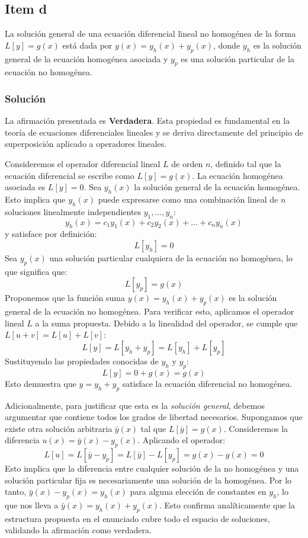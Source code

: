 \documentclass[a4paper]{article}
\begin{document}
\subsection{Item d}
La solución general de una ecuación diferencial lineal no homogénea de la forma $L[y] = g(x)$ está dada por $y(x) = y_h(x) + y_p(x)$, donde $y_h$ es la solución general de la ecuación homogénea asociada y $y_p$ es una solución particular de la ecuación no homogénea.

\subsubsection{Solución}
La afirmación presentada es \textbf{Verdadera}. Esta propiedad es fundamental en la teoría de ecuaciones diferenciales lineales y se deriva directamente del principio de superposición aplicado a operadores lineales.

Consideremos el operador diferencial lineal $L$ de orden $n$, definido tal que la ecuación diferencial se escribe como $L[y] = g(x)$. La ecuación homogénea asociada es $L[y] = 0$.
Sea $y_h(x)$ la solución general de la ecuación homogénea. Esto implica que $y_h(x)$ puede expresarse como una combinación lineal de $n$ soluciones linealmente independientes $y_1, \dots, y_n$:
$$
y_h(x) = c_1 y_1(x) + c_2 y_2(x) + \dots + c_n y_n(x)
$$
y satisface por definición:
$$
L[y_h] = 0
$$
Sea $y_p(x)$ una solución particular cualquiera de la ecuación no homogénea, lo que significa que:
$$
L[y_p] = g(x)
$$
Proponemos que la función suma $y(x) = y_h(x) + y_p(x)$ es la solución general de la ecuación no homogénea. Para verificar esto, aplicamos el operador lineal $L$ a la suma propuesta. Debido a la linealidad del operador, se cumple que $L[u + v] = L[u] + L[v]$:
$$
L[y] = L[y_h + y_p] = L[y_h] + L[y_p]
$$
Sustituyendo las propiedades conocidas de $y_h$ y $y_p$:
$$
L[y] = 0 + g(x) = g(x)
$$
Esto demuestra que $y = y_h + y_p$ satisface la ecuación diferencial no homogénea.

Adicionalmente, para justificar que esta es la \textit{solución general}, debemos argumentar que contiene todos los grados de libertad necesarios. Supongamos que existe otra solución arbitraria $\bar{y}(x)$ tal que $L[\bar{y}] = g(x)$. Consideremos la diferencia $u(x) = \bar{y}(x) - y_p(x)$. Aplicando el operador:
$$
L[u] = L[\bar{y} - y_p] = L[\bar{y}] - L[y_p] = g(x) - g(x) = 0
$$
Esto implica que la diferencia entre cualquier solución de la no homogénea y una solución particular fija es necesariamente una solución de la homogénea. Por lo tanto, $\bar{y}(x) - y_p(x) = y_h(x)$ para alguna elección de constantes en $y_h$, lo que nos lleva a $\bar{y}(x) = y_h(x) + y_p(x)$. Esto confirma analíticamente que la estructura propuesta en el enunciado cubre todo el espacio de soluciones, validando la afirmación como verdadera.
\end{document}
